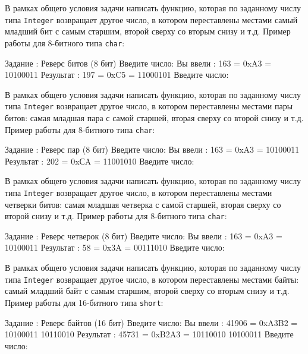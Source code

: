 \begin{zztask}
В рамках общего условия задачи написать функцию, которая по заданному
числу типа \texttt{Integer} возвращает другое число, в котором переставлены местами
самый младший бит с самым старшим, второй сверху со вторым снизу и т.д.
Пример работы для 8-битного типа \texttt{char}:
\begin{zzoutput}
  Задание \thezztask: Реверс битов (8 бит)
  Введите число: 
  Вы ввели  :  163 = 0xA3 = 10100011
  Результат :  197 = 0xC5 = 11000101
  Введите число: \zzuser{ }
\end{zzoutput}
\end{zztask}


\begin{zztask}
В рамках общего условия задачи написать функцию, которая по заданному числу
типа \texttt{Integer} возвращает другое число, в котором переставлены
местами пары битов: самая младшая пара с самой старшей, вторая
сверху со второй снизу и т.д.
Пример работы для 8-битного типа \texttt{char}:
\begin{zzoutput}
  Задание \thezztask: Реверс пар (8 бит)
  Введите число: 
  Вы ввели  :  163 = 0xA3 = 10100011
  Результат :  202 = 0xСA = 11001010
  Введите число: \zzuser{ }
\end{zzoutput}
\end{zztask}


\begin{zztask}
В рамках общего условия задачи написать функцию, которая по заданному числу
типа \texttt{Integer} возвращает другое число, в котором переставлены
местами четверки битов: самая младшая четверка с самой старшей, вторая
сверху со второй снизу и т.д.
Пример работы для 8-битного типа \texttt{char}:
\begin{zzoutput}
  Задание \thezztask: Реверс четверок (8 бит)
  Введите число: 
  Вы ввели  :  163 = 0xA3 = 10100011
  Результат :   58 = 0x3A = 00111010
  Введите число: \zzuser{ }
\end{zzoutput}
\end{zztask}


\begin{zztask}
В рамках общего условия задачи написать функцию, которая по заданному числу
типа \texttt{Integer} возвращает другое число, в котором переставлены
местами байты: самый младший байт с самым старшим, второй сверху со вторым
снизу и т.д.
Пример работы для 16-битного типа \texttt{short}:
\begin{zzoutput}
  Задание \thezztask: Реверс байтов (16 бит)
  Введите число: 
  Вы ввели  : 41906 = 0xA3B2 = 10100011 10110010
  Результат : 45731 = 0xB2A3 = 10110010 10100011
  Введите число: \zzuser{ }
\end{zzoutput}
\end{zztask}

